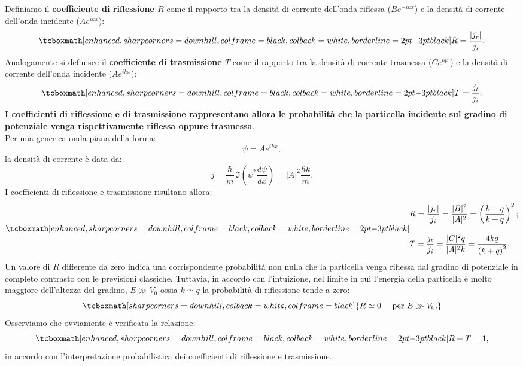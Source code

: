Definiamo il \textbf{coefficiente di riflessione $R$} come il rapporto tra la densità di corrente dell'onda riflessa ($\displaystyle{Be^{-ikx}}$) e la densità di corrente dell'onda incidente ($\displaystyle{Ae^{ikx}}$):
	\begin{equation}
		\tcboxmath[enhanced, sharp corners=downhill, colframe=black, colback=white, borderline={2pt}{-3pt}{black}]{
			R=\frac{|j_r|}{j_i}.
			}
	\end{equation}
Analogamente si definisce il \textbf{coefficiente di trasmissione $T$} come il rapporto tra la densità di corrente trasmessa ($\displaystyle{Ce^{iqx}}$) e la densità di corrente dell'onda incidente ($\displaystyle{Ae^{ikx}}$):
	\begin{equation}
		\tcboxmath[enhanced, sharp corners=downhill, colframe=black, colback=white, borderline={2pt}{-3pt}{black}]{
			T=\frac{j_t}{j_i}.
			}
	\end{equation}
\textbf{I coefficienti di riflessione e di trasmissione rappresentano allora le probabilità che la particella incidente sul gradino di potenziale venga rispettivamente riflessa oppure trasmessa}.\\
Per una generica onda piana della forma:
	\begin{equation}
		\psi= Ae^{ikx},
	\end{equation}
la densità di corrente è data da:
	\begin{equation}
		j=\frac{\hbar}{m}\, \Im \left(\psi ^* \frac{d\psi}{dx} \right)= |A|^2\frac{\hbar k}{m}.
	\end{equation}
I coefficienti di riflessione e trasmissione risultano allora:
	\begin{equation}
		\tcboxmath[enhanced, sharp corners=downhill, colframe=black, colback=white, borderline={2pt}{-3pt}{black}]{
			\begin{aligned}
			& R=\frac{|j_r|}{j_i}= \frac{|B|^2}{|A|^2}=\left(\frac{k-q}{k+q}\right)^2; \\[0.3cm]
			& T=\frac{j_t}{j_i}= \frac{|C|^2 q}{|A|^2 k}=\frac{4kq}{\left(k+q\right)^2}. 
			\end{aligned}
			}
	\end{equation}
Un valore di $R$ differente da zero indica una corrispondente probabilità non nulla che la particella venga riflessa dal gradino di potenziale in completo contrasto con le previsioni classiche. Tuttavia, in accordo con l'intuizione, nel limite in cui l'energia della particella è molto maggiore dell'altezza del gradino, $E\gg V_0$ ossia $k\simeq q$ la probabilità di riflessione tende a zero:
	\begin{equation}
		\tcboxmath[sharp corners=downhill, colback=white, colframe=black]{
			R\simeq 0\quad  \textrm{ per } E\gg V_0.
			}
	\end{equation}
Osserviamo che ovviamente è verificata la relazione:
	\begin{equation}
		\tcboxmath[enhanced, sharp corners=downhill, colframe=black, colback=white, borderline={2pt}{-3pt}{black}]{
			R+T=1,
			}
	\label{eq:cap10_5}
	\end{equation}
in accordo con l'interpretazione probabilistica dei coefficienti di riflessione e trasmissione.\\

